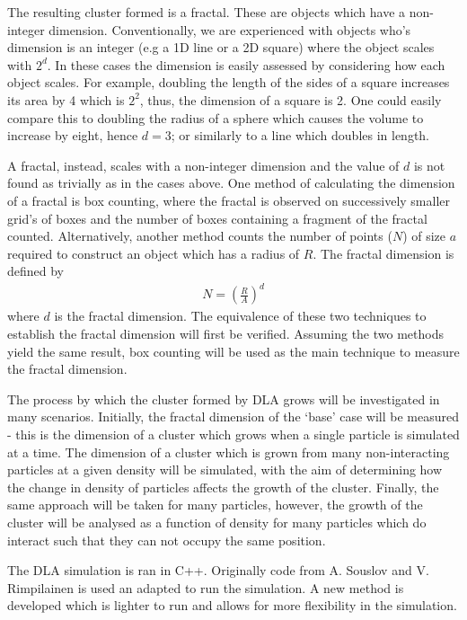 \documentclass[%
 reprint,
 amsmath,amssymb,
 aps,
]{revtex4-2}
\begin{document}
The resulting cluster formed is a fractal. These are objects which have a non-integer dimension. Conventionally, we are experienced with objects who's dimension is an integer (e.g a 1D line or a 2D square) where the object scales with $2^d$. In these cases the dimension is easily assessed by considering how each object scales. For example, doubling the length of the sides of a square increases its area by 4 which is $2^2$, thus, the dimension of a square is 2. One could easily compare this to doubling the radius of a sphere which causes the volume to increase by eight, hence $d=3$; or similarly to a line which doubles in length. 

A fractal, instead, scales with a non-integer dimension and the value of $d$ is not found as trivially as in the cases above. One method of calculating the dimension of a fractal is box counting, where the fractal is observed on successively smaller grid's of boxes and the number of boxes containing a fragment of the fractal counted. Alternatively, another method counts the number of points ($N$) of size $a$ required to construct an object which has a radius of $R$. The fractal dimension is defined by
\begin{align}
\label{eq:FractalDimensionRelation}
N = \left ( \frac{R}{A} \right )^d
\end{align}
where $d$ is the fractal dimension. The equivalence of these two techniques to establish the fractal dimension will first be verified. Assuming the two methods yield the same result, box counting will be used as the main technique to measure the fractal dimension.

The process by which the cluster formed by DLA grows will be investigated in many scenarios. Initially, the fractal dimension of the `base' case will be measured - this is the dimension of a cluster which grows when a single particle is simulated at a time. The dimension of a cluster which is grown from many non-interacting particles at a given density will be simulated, with the aim of determining how the change in density of particles affects the growth of the cluster. Finally, the same approach will be taken for many particles, however, the growth of the cluster will be analysed as a function of density for many particles which do interact such that they can not occupy the same position.


The DLA simulation is ran in C++. Originally code from A. Souslov and V. Rimpilainen is used an adapted to run the simulation. A new method is developed which is lighter to run and allows for more flexibility in the simulation.
\end{document}
